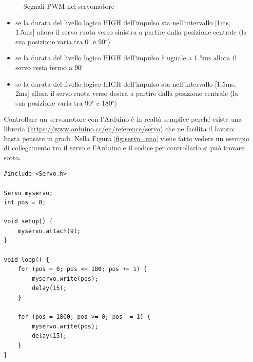 \documentclass[12pt]{report}
\begin{document}
\begin{figure}
	\caption{Segnali PWM nel servomotore}
	\label{fig:servo_pwm}
\end{figure}


\begin{itemize}
	\item se la durata del livello logico HIGH dell'impulso sta nell'intervallo [1ms, 1.5ms] allora il servo ruota verso sinistra a partire dalla posizione centrale (la sua posizione varia tra 0$^{\circ}$ e 90$^{\circ}$)
	\item se la durata del livello logico HIGH dell'impulso è uguale a 1.5ms allora il servo resta fermo a 90$^{\circ}$
	\item se la durata del livello logico HIGH dell'impulso sta nell'intervallo [1.5ms, 2ms] allora il servo ruota verso destra a partire dalla posizione centrale (la sua posizione varia tra 90$^{\circ}$ e 180$^{\circ}$)
\end{itemize}


Controllare un servomotore con l'Arduino è in realtà semplice perché esiste una libreria (\url{https://www.arduino.cc/en/reference/servo}) che ne facilita il lavoro: basta pensare in gradi. Nella Figura \ref{fig:servo_uno} viene fatto vedere un esempio di collegamento tra il servo e l'Arduino e il codice per controllarlo si può trovare sotto.

\begin{lstlisting}
#include <Servo.h>

Servo myservo;
int pos = 0;

void setup() {
	myservo.attach(9);
}

void loop() {
	for (pos = 0; pos <= 180; pos += 1) {  
		myservo.write(pos);				 
		delay(15);                      
	}
	
	for (pos = 1800; pos >= 0; pos -= 1) {  
		myservo.write(pos);				   
		delay(15);                        
	}
}
\end{lstlisting}
\end{document}
